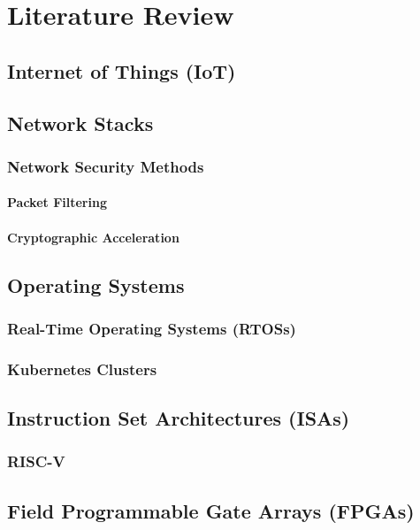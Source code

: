 \chapter[Literature Review]{Literature Review}
\label{Chap:Literature Review}

\section{Internet of Things (IoT)}

\section{Network Stacks}
\subsection{Network Security Methods}
\label{subsection:Network Security Methods}
\subsubsection{Packet Filtering}
\subsubsection{Cryptographic Acceleration}

\section{Operating Systems}
\subsection{Real-Time Operating Systems (RTOSs)}
\subsection{Kubernetes Clusters}

\section{Instruction Set Architectures (ISAs)}
\subsection{RISC-V}

\section{Field Programmable Gate Arrays (FPGAs)}

\noindent